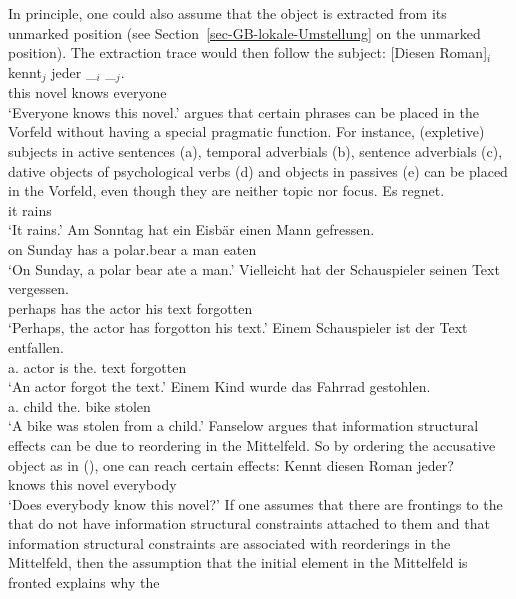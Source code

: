 In principle, one could also assume that the object is extracted from its unmarked position (see
Section~\ref{sec-GB-lokale-Umstellung} on the unmarked position). The extraction trace would then
follow the subject:
\ea
\label{Beispiel-Diesen-Mann-kent-jeder-trace-follows-subjectHPSG}
\gll {}[Diesen Roman]$_i$ kennt$_j$ jeder \_$_i$  \_$_j$.\\
	 {}\spacebr{}this novel knows everyone {}\\
\glt `Everyone knows this novel.'
\z
\citet{Fanselow2004c} argues that certain phrases can be placed in the Vorfeld without having a
special pragmatic function. For instance, (expletive) subjects in active sentences (a),
temporal adverbials (b), sentence adverbials (c), dative objects of psychological verbs (d) and objects in
passives (e) can be placed in the Vorfeld, even though they are neither topic nor focus.
\eal
\ex
\gll Es regnet.\\
     it rains\\
\glt `It rains.'
\ex 
\gll Am Sonntag hat ein Eisbär einen Mann gefressen.\\
     on Sunday  has a   polar.bear a man eaten\\
\glt `On Sunday, a polar bear ate a man.'
\ex 
\gll Vielleicht hat der Schauspieler seinen Text vergessen.\\
     perhaps    has the actor his text forgotten\\
\glt `Perhaps, the actor has forgotton his text.'
\ex 
\gll Einem Schauspieler ist der Text entfallen.\\
     a.\dat{} actor is the.\nom{} text forgotten\\
\glt `An actor forgot the text.'
\ex
\gll Einem    Kind  wurde  das Fahrrad gestohlen.\\
     a.\dat{} child \AUX{} the.\nom{} bike stolen\\
\glt `A bike was stolen from a child.'
\zl
Fanselow argues that information structural effects can be due to reordering in the Mittelfeld. So
by ordering the accusative object as in (), one can reach certain effects:
\ea
\gll Kennt diesen Roman jeder?\\
     knows this novel everybody\\
\glt `Does everybody know this novel?'
\z
If one assumes that there are frontings to the \vf that do not have information structural constraints
attached to them and that information structural constraints are associated with reorderings in the
Mittelfeld, then the assumption that the initial element in the Mittelfeld is fronted explains why the
